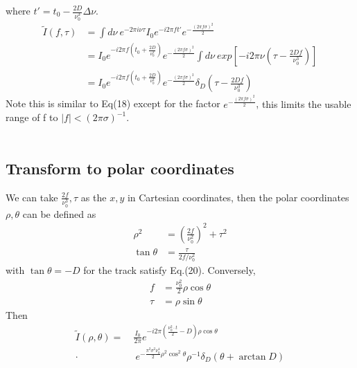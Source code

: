 \documentclass[twocolumn]{aastex61}
\begin{document}
where $t'=t_0 - \frac{2D}{\nu _0 ^3}\Delta \nu$.  
\begin{equation}
\begin{aligned}
\widetilde{I}(f,\tau)  & = \int d\nu~ e^{-2\pi i\nu \tau}I_0  e^{-i2\pi ft'}e^{-\frac{(2\pi f\sigma)^2}{2}} \\
&= I_0e^{-i2\pi f(t_0 + \frac{2D}{\nu _0 ^2})}e^{-\frac{(2\pi f\sigma)^2}{2}}\int d\nu~exp[-i2\pi\nu(\tau - \frac{2Df}{\nu ^3_0})] \\
&= {I_0} e^{-i2\pi f(t_0+\frac{2D}{\nu ^2 _0})}e^{-\frac{(2\pi f\sigma)^2}{2}}\delta _D (\tau - \frac{2Df}{\nu ^3 _0})
\end{aligned}
\end{equation}
Note this is similar to Eq(18) except for the factor $e^{-\frac{(2\pi f \sigma)^2}{2}}$,  {\color{red}this limits the usable range of f to $|f|<(2\pi\sigma)^{-1}$. }
\\ \\

\subsection{Transform to polar coordinates}
\label{sec:discussion}
We can take $\frac{2f}{\nu _0 ^3},\tau$ as the $x,y$ in Cartesian coordinates, then the polar coordinates $\rho,\theta$ can be defined as 
\begin{equation}
\begin{aligned}
\rho ^2 &= \left(\frac{2f}{\nu _0 ^2}\right) ^2 + \tau ^2 \\
\tan\theta &= \frac{\tau}{2f/\nu ^2 _0} 
\end{aligned}
\end{equation}
with $\tan \theta = -D$ for the track satisfy Eq.(20). Conversely, 
\begin{equation}
\begin{aligned}
f &= \frac{\nu ^2 _0}{2}\rho \cos\theta \\
\tau &= \rho \sin \theta
\end{aligned}
\end{equation}
Then 
\begin{equation}
\begin{aligned}
\widetilde{I}(\rho, \theta) = ~&\frac{I_0}{2\pi}e^{-i2\pi\left(\frac{\nu ^2 _0\cdot t}{2}-D \right)\rho\cos\theta}~\\ 
\cdot & ~e^{-\frac{\pi^2\sigma ^2 \nu _0 ^4}{2}\rho ^2 \cos ^2 \theta}\rho ^{-1} \delta _D (\theta + \arctan D)
\end{aligned}
\end{equation}
\end{document}
